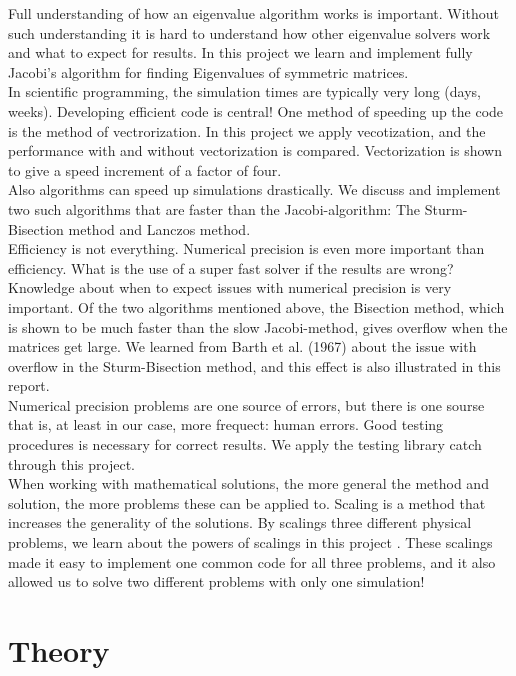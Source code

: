 \documentclass{article}
\begin{document}
Full understanding of how an eigenvalue algorithm works is important. Without such understanding it is hard to understand how other eigenvalue solvers work and what to expect for results. In this project we learn and implement fully Jacobi's algorithm for finding Eigenvalues of symmetric matrices.\\

In scientific programming, the simulation times are typically very long (days, weeks). Developing efficient code is central! One method of speeding up the code is the method of vectrorization. In this project we apply vecotization, and the performance with and without vectorization is compared. Vectorization is shown to give a speed increment of a factor of four.\\

Also algorithms can speed up simulations drastically. We discuss and implement two such algorithms that are faster than the Jacobi-algorithm: The Sturm-Bisection method and Lanczos method.\\

Efficiency is not everything. Numerical precision is even more important than efficiency. What is the use of a super fast solver if the results are wrong? Knowledge about when to expect issues with numerical precision is very important. Of the two algorithms mentioned above, the Bisection method, which is shown to be much faster than the slow Jacobi-method, gives overflow when the matrices get large. We learned from Barth et al. (1967) \cite{barth} about the issue with overflow in the Sturm-Bisection method, and this effect is also illustrated in this report.\\

Numerical precision problems are one source of errors, but there is one sourse that is, at least in our case, more frequect: human errors. Good testing procedures is necessary for correct results. We apply the testing library catch through this project.\\

When working with mathematical solutions, the more general the method and solution, the more problems these can be applied to. Scaling is a method that increases the generality of the solutions. By scalings three different physical problems, we learn about the powers of scalings in this project . These scalings made it easy to implement one common code for all three problems, and it also allowed us to solve two different problems with only one simulation!

\section{Theory}
\end{document}
